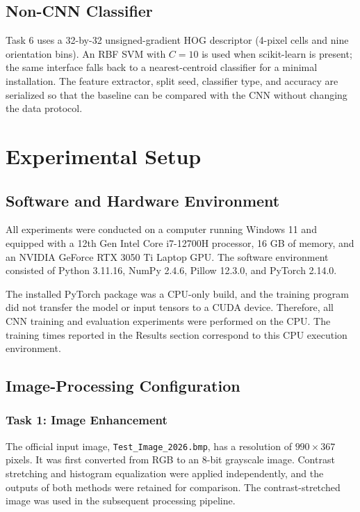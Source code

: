 \documentclass[conference]{IEEEtran}
\begin{document}
\subsection{Non-CNN Classifier}
Task 6 uses a 32-by-32 unsigned-gradient HOG descriptor (4-pixel cells and nine
orientation bins). An RBF SVM with $C=10$ is used when scikit-learn is present;
the same interface falls back to a nearest-centroid classifier for a minimal
installation. The feature extractor, split seed, classifier type, and accuracy
are serialized so that the baseline can be compared with the CNN without
changing the data protocol.

\section{Experimental Setup}

\subsection{Software and Hardware Environment}

All experiments were conducted on a computer running Windows 11 and
equipped with a 12th Gen Intel Core i7-12700H processor, 16 GB of
memory, and an NVIDIA GeForce RTX 3050 Ti Laptop GPU. The software
environment consisted of Python 3.11.16, NumPy 2.4.6, Pillow 12.3.0,
and PyTorch 2.14.0.

The installed PyTorch package was a CPU-only build, and the training
program did not transfer the model or input tensors to a CUDA device.
Therefore, all CNN training and evaluation experiments were performed
on the CPU. The training times reported in the Results section
correspond to this CPU execution environment.

\subsection{Image-Processing Configuration}

\subsubsection{Task 1: Image Enhancement}

The official input image, \texttt{Test\_Image\_2026.bmp}, has a
resolution of $990\times367$ pixels. It was first converted from RGB
to an 8-bit grayscale image. Contrast stretching and histogram
equalization were applied independently, and the outputs of both
methods were retained for comparison. The contrast-stretched image
was used in the subsequent processing pipeline.
\end{document}
